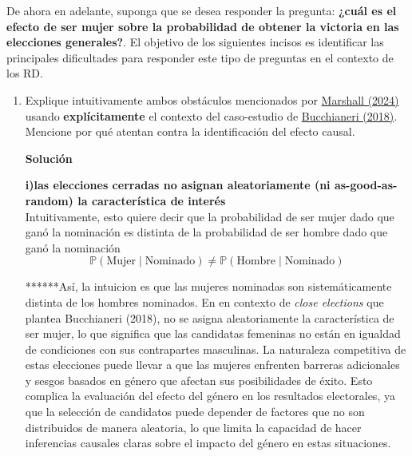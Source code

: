 \documentclass[a4paper, answers, addpoints, 11pt]{exam}
\newenvironment{solucion}{%
  \begin{mdframed}[
    backgroundcolor=blue!5,    %
    linecolor=blue!50,          %
    linewidth=2pt,              %
    leftmargin=10pt,            %
    rightmargin=8pt,           %
    topline=true,              %
    bottomline=true,            %
    roundcorner=10pt,           %
    innerleftmargin=10pt,       %
    innerrightmargin=10pt,      %
    innerbottommargin=10pt,     %
    innertopmargin=10pt         %
  ]%
  \begin{tcolorbox}[colframe=blue!50!black, colback=blue!50, coltitle=white, sharp corners=all, boxrule=1mm, width=\textwidth, halign=left, valign=center, top=0mm, bottom=0mm, left=0mm, right=0mm] \textbf{Solución} \end{tcolorbox} }{\end{mdframed}}
\begin{document}
De ahora en adelante, suponga que se desea responder la pregunta: \textbf{¿cuál es el efecto de ser mujer sobre la probabilidad de obtener la victoria en las elecciones generales?}. El objetivo de los siguientes incisos es identificar las principales dificultades para responder este tipo de preguntas en el contexto de los RD.

\bigskip

\begin{enumerate}[resume]
    
\item Explique intuitivamente ambos obstáculos mencionados por \href{https://onlinelibrary-wiley-com.ezproxy.uniandes.edu.co/doi/full/10.1111/ajps.12741}{Marshall (2024)} usando \textbf{explícitamente} el contexto del caso-estudio de \href{https://link.springer.com/article/10.1007/s11109-017-9407-7}{Bucchianeri (2018)}. Mencione por qué atentan contra la identificación del efecto causal. 

        \begin{solucion}
\textbf{i)las elecciones cerradas no asignan aleatoriamente (ni as-good-as-random) la
característica de interés}\\
Intuitivamente, esto quiere decir que la probabilidad de ser mujer dado que ganó la nominación es distinta de la probabilidad de ser hombre dado que ganó la nominación
\[
    \mathbb{P}(\text{Mujer} \mid \text{Nominado}) \neq \mathbb{P}(\text{Hombre} \mid \text{Nominado})
    \]

******Así, la intuicion es que las mujeres nominadas son sistemáticamente distinta de los hombres nominados. En en contexto de \textit{close elections} que plantea Bucchianeri (2018), no se asigna aleatoriamente la característica de ser mujer, lo que significa que las candidatas femeninas no están en igualdad de condiciones con sus contrapartes masculinas. La naturaleza competitiva de estas elecciones puede llevar a que las mujeres enfrenten barreras adicionales y sesgos basados en género que afectan sus posibilidades de éxito. Esto complica la evaluación del efecto del género en los resultados electorales, ya que la selección de candidatos puede depender de factores que no son distribuidos de manera aleatoria, lo que limita la capacidad de hacer inferencias causales claras sobre el impacto del género en estas situaciones.


\end{solucion}
\end{enumerate}
\end{document}
